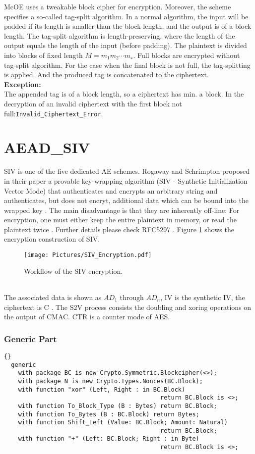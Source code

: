 McOE uses a tweakable block cipher for encryption. Moreover, the scheme specifies a so-called tag-split algorithm. In a normal algorithm, the input will be padded if its length is smaller than the block length, and the output is of a block length. The tag-split algorithm is length-preserving, where the length of the output equals the length of the input (before padding). The plaintext is divided into blocks of fixed length $M=m_1m_2\cdots m_∗$. Full blocks are encrypted without
tag-split algorithm. For the case when the final block is not full, the tag-splitting is applied. And the produced tag is concatenated to the ciphertext.\\
\textbf{Exception:}\\ The appended tag is of a block length, so a ciphertext has min. a block.
In the decryption of an invalid ciphertext with the first block not full:\quad\texttt{Invalid\_Ciphertext\_Error}.\\
\section{AEAD\_SIV}
SIV is one of the five dedicated AE schemes. Rogaway and Schrimpton proposed in their paper a provable key-wrapping algorithm (SIV - Synthetic Initialization Vector Mode) that authenticates and encrypts an arbitrary string and authenticates, but does not encryt, additional data which can be bound into the wrapped key \cite{SIV}. The main disadvantage is that they are inherently off-line: For encryption, one must either keep the entire plaintext in memory, or read the plaintext twice \cite{DBLP:conf/fse/FleischmannFL12}. Further details please check RFC5297 \cite{SIV}. Figure \ref{SIVEN} shows the encryption construction of SIV.\\
\begin{figure}[h]
\centering
\texttt{[image: Pictures/SIV\_Encryption.pdf]} 
\caption{Workflow of the SIV encryption.}\label{SIVEN}
\end{figure}\\
The associated data is shown as $AD_1$ through $AD_n$, IV is the synthetic IV, the ciphertext is C \cite{SIV}. The S2V process consists the doubling and xoring operations on the output of CMAC. CTR is a counter mode of AES.
\subsubsection*{Generic Part}
\begin{lstlisting}{}
  generic
    with package BC is new Crypto.Symmetric.Blockcipher(<>);
    with package N is new Crypto.Types.Nonces(BC.Block);
    with function "xor" (Left, Right : in BC.Block) 
    										return BC.Block is <>;        
    with function To_Block_Type (B : Bytes) return BC.Block;                      
    with function To_Bytes (B : BC.Block) return Bytes;                           
    with function Shift_Left (Value: BC.Block; Amount: Natural) 
    										return BC.Block;
    with function "+" (Left: BC.Block; Right : in Byte) 
    										return BC.Block is <>;  
\end{lstlisting}
